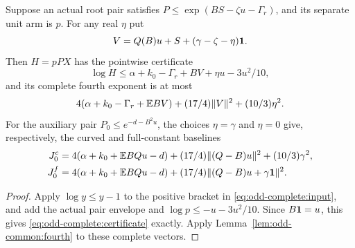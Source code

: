 \begin{lemma}
\label{lem:odd-complete:certificate}
Suppose an actual root pair satisfies
$P\le\exp(BS-\zeta u-\Gamma_r)$, and its separate unit arm is $p$.
For any real $\eta$ put
\[
 V=Q(B)u+S+(\gamma-\zeta-\eta)\mathbf1.
\]
Then $H=pPX$ has the pointwise certificate
\begin{equation}\label{eq:odd-complete:certificate}
 \log H\le\alpha+k_0-\Gamma_r+BV+\eta u-3u^2/10,
\end{equation}
and its complete fourth exponent is at most
\[
 4(\alpha+k_0-\Gamma_r+\mathbb E BV)
       +(17/4)\|V\|^2+(10/3)\eta^2.
\]
For the auxiliary pair $P_0\le e^{-d-B^2u}$, the choices
$\eta=\gamma$ and $\eta=0$ give, respectively, the curved and
full-constant baselines
\begin{align}
 J_0^c&=4(\alpha+k_0+\mathbb E BQu-d)
        +(17/4)\|(Q-B)u\|^2+(10/3)\gamma^2,
       \label{eq:odd-complete:baseline-curved}\\
 J_0^f&=4(\alpha+k_0+\mathbb E BQu-d)
        +(17/4)\|(Q-B)u+\gamma\mathbf1\|^2.
       \label{eq:odd-complete:baseline-full}
\end{align}
\end{lemma}
\begin{proof}
Apply $\log y\le y-1$ to the positive bracket in
\eqref{eq:odd-complete:input}, and add the actual pair envelope and
$\log p\le-u-3u^2/10$. Since $B\mathbf1=u$, this gives
\eqref{eq:odd-complete:certificate} exactly. Apply
Lemma~\ref{lem:odd-common:fourth} to these complete vectors.
\end{proof}

